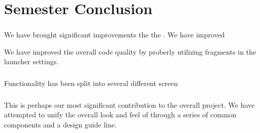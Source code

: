 \chapter{Semester Conclusion}
\label{cha:conclusion_final}

\subsection{\launcher}
We have brought significant improvements the the \launcher. We have improved 


We have improved the overall code quality by proberly utilizing fragments in the launcher settings.   

\subsection{\ct}

Functionality has been split into several different screen

\subsection{\gc}

This is perhaps our most significant contribution to the overall project. We have attempted to unify the overall look and feel of \giraf through a series of common components and a design guide line. 